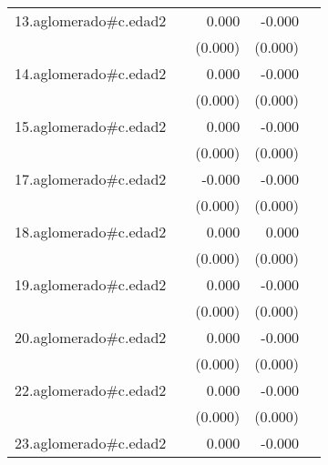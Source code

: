 {\begin{longtable}{l*{4}{D{.}{.}{-1}}}
\addlinespace
13.aglomerado#c.edad2&                     &       0.000         &      -0.000         &                     \\
            &                     &     (0.000)         &     (0.000)         &                     \\
\addlinespace
14.aglomerado#c.edad2&                     &       0.000         &      -0.000         &                     \\
            &                     &     (0.000)         &     (0.000)         &                     \\
\addlinespace
15.aglomerado#c.edad2&                     &       0.000         &      -0.000         &                     \\
            &                     &     (0.000)         &     (0.000)         &                     \\
\addlinespace
17.aglomerado#c.edad2&                     &      -0.000         &      -0.000\sym{***}&                     \\
            &                     &     (0.000)         &     (0.000)         &                     \\
\addlinespace
18.aglomerado#c.edad2&                     &       0.000\sym{*}  &       0.000         &                     \\
            &                     &     (0.000)         &     (0.000)         &                     \\
\addlinespace
19.aglomerado#c.edad2&                     &       0.000         &      -0.000         &                     \\
            &                     &     (0.000)         &     (0.000)         &                     \\
\addlinespace
20.aglomerado#c.edad2&                     &       0.000         &      -0.000         &                     \\
            &                     &     (0.000)         &     (0.000)         &                     \\
\addlinespace
22.aglomerado#c.edad2&                     &       0.000         &      -0.000\sym{*}  &                     \\
            &                     &     (0.000)         &     (0.000)         &                     \\
\addlinespace
23.aglomerado#c.edad2&                     &       0.000\sym{*}  &      -0.000         &                     \\

\end{longtable}}
